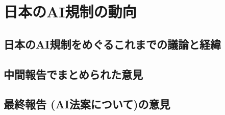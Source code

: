 \chapter{日本のAI規制の動向}

\section{日本のAI規制をめぐるこれまでの議論と経緯}

\section{中間報告でまとめられた意見}

\section{最終報告 (AI法案について)の意見}